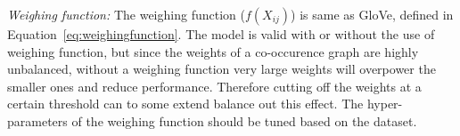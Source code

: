 %
\noindent
\emph{Weighing function:} The weighing function ($f(X_{ij})$) is same as GloVe, defined in Equation~\ref{eq:weighingfunction}. The model is valid with or without the use of weighing function, but since the weights of a co-occurence graph are highly unbalanced, without a weighing function very large weights will overpower the smaller ones and reduce performance. Therefore cutting off the weights at a certain threshold can to some extend balance out this effect. The hyper-parameters of the weighing function should be tuned based on the dataset.\\

%

